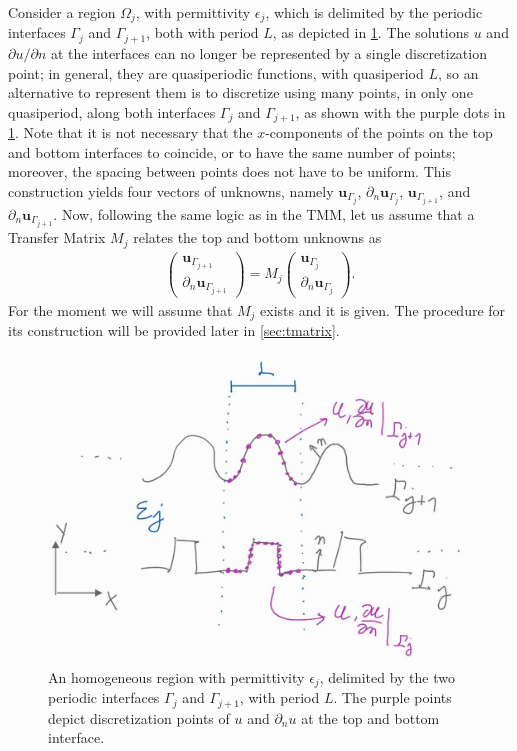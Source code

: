 \documentclass[reprint,amsmath,amssymb,
 aps]{revtex4-2}
\newcommand{\bol}{\boldsymbol}
\begin{document}
Consider a region $\Omega_j$, with permittivity $\epsilon_j$, which is delimited by the periodic interfaces $\Gamma_j$ and $\Gamma_{j+1}$, both with period $L$, as depicted in \cref{fig:bie_layer}. The solutions $u$ and $\partial u/\partial n$ at the interfaces can no longer be represented by a single discretization point; in general, they are quasiperiodic functions, with quasiperiod $L$, so an alternative to represent them is to discretize using many points, in only one quasiperiod, along both interfaces $\Gamma_j$ and $\Gamma_{j+1}$, as shown with the purple dots in \cref{fig:bie_layer}. Note that it is not necessary that the $x$-components of the points on the top and bottom interfaces to coincide, or to have the same number of points; moreover, the spacing between points does not have to be uniform. This construction yields four vectors of unknowns, namely $\bol u_{\Gamma_j}$, $ \partial_n \bol u_{\Gamma_j}$, $\bol u_{\Gamma_{j+1}}$, and $ \partial_n \bol u_{\Gamma_{j+1}}$. Now, following the same logic as in the TMM, let us assume that a Transfer Matrix $M_j$ relates the top and bottom unknowns as
\begin{align}
\begin{pmatrix}
\bol u_{\Gamma_{j+1}} \\
\partial_n \bol u_{\Gamma_{j+1}} 
\end{pmatrix} 
= M_j
\begin{pmatrix}
\bol u_{\Gamma_j} \\
\partial_n \bol u_{\Gamma_j} 
\end{pmatrix}.  \label{eq:bie_tmatrix}
\end{align}
For the moment we will assume that $M_j$ exists and it is given. The procedure for its construction will be provided later in \cref{sec:tmatrix}.

\begin{figure}[h!]
\includegraphics[width=0.6\columnwidth]{figures/bie_layer.jpg}
\caption{An homogeneous region with permittivity $\epsilon_j$, delimited by the two periodic interfaces $\Gamma_j$ and $\Gamma_{j+1}$, with period $L$. The purple points depict discretization points of $u$ and $\partial_n u$ at the top and bottom interface.}
\label{fig:bie_layer}
\end{figure}
\end{document}
